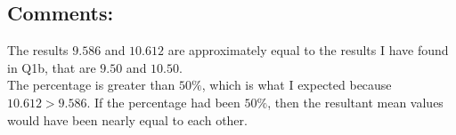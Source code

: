 \documentclass[12pt]{article}
\begin{document}
\vspace{3cm}
\subsection*{Comments:}
The results $9.586$ and $10.612$ are approximately equal to the results I have found in Q1b, that are $9.50$ and $10.50$.\\
The percentage is greater than $50\%$, which is what I expected because $10.612 > 9.586$. If the percentage had been $50\%$, then the resultant mean values would have been nearly equal to each other.
\end{document}
